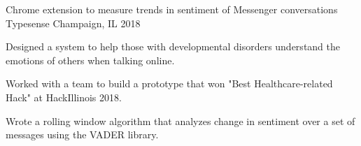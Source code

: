 \begin{cventries}
\cventry
{Chrome extension to measure trends in sentiment of Messenger conversations} %
{Typesense} %
{Champaign, IL} %
{2018} %
{
	\begin{cvitems} %
		\item {Designed a system to help those with developmental disorders understand the emotions of others when talking online.}
		\item {Worked with a team to build a prototype that won "Best Healthcare-related Hack" at HackIllinois 2018.}
		\item {Wrote a rolling window algorithm that analyzes change in sentiment over a set of messages using the VADER library.}
	\end{cvitems}
}


\end{cventries}
